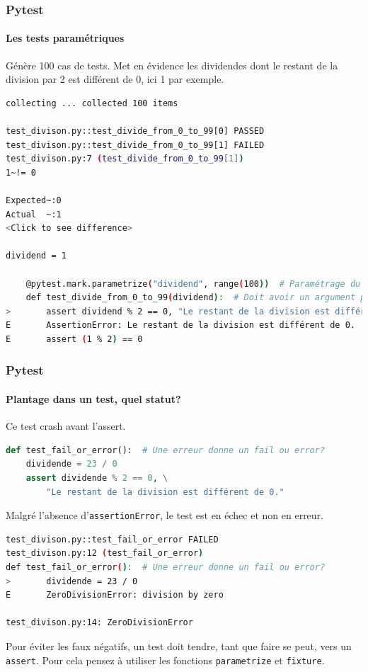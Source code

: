 \documentclass{beamer}
\begin{document}
    \begin{frame}[fragile]
        \frametitle{Pytest}
        \framesubtitle{Les tests paramétriques}
        \transdissolve
        Génère 100 cas de tests.
        Met en évidence les dividendes dont le restant de la division par 2 est différent de 0, ici 1 par exemple.
        \begin{lstlisting}[language=sh]
collecting ... collected 100 items

test_divison.py::test_divide_from_0_to_99[0] PASSED                      [  1%]
test_divison.py::test_divide_from_0_to_99[1] FAILED                      [  2%]
test_divison.py:7 (test_divide_from_0_to_99[1])
1~!= 0

Expected~:0
Actual  ~:1
<Click to see difference>

dividend = 1

    @pytest.mark.parametrize("dividend", range(100))  # Paramétrage du test
    def test_divide_from_0_to_99(dividend):  # Doit avoir un argument présent dans le paramétrage
>       assert dividend % 2 == 0, "Le restant de la division est différent de 0."
E       AssertionError: Le restant de la division est différent de 0.
E       assert (1 % 2) == 0
        \end{lstlisting}
    \end{frame}

    \begin{frame}[fragile]
        \frametitle{Pytest}
        \framesubtitle{Plantage dans un test, quel statut?}
        \transdissolve
        Ce test crash avant l'assert.
        \begin{lstlisting}[language=Python]
def test_fail_or_error():  # Une erreur donne un fail ou error?
    dividende = 23 / 0
    assert dividende % 2 == 0, \
        "Le restant de la division est différent de 0."
        \end{lstlisting}
        Malgré l'absence d'\lstinline{assertionError}, le test est en échec et non en erreur.
        \begin{lstlisting}[language=sh]
test_divison.py::test_fail_or_error FAILED                               [100%]
test_divison.py:12 (test_fail_or_error)
def test_fail_or_error():  # Une erreur donne un fail ou error?
>       dividende = 23 / 0
E       ZeroDivisionError: division by zero

test_divison.py:14: ZeroDivisionError
        \end{lstlisting}

        \begin{dangercolorbox}
            Pour éviter les faux négatifs, un test doit tendre, tant que faire se peut, vers un \lstinline{assert}.
            Pour cela pensez à utiliser les fonctions \lstinline{parametrize} et \lstinline{fixture}.
        \end{dangercolorbox}
    \end{frame}
\end{document}

